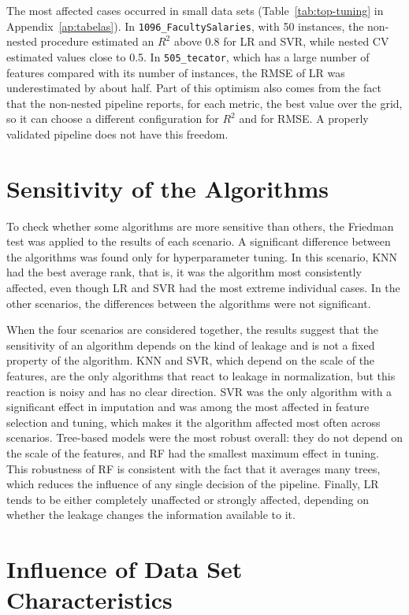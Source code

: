 The most affected cases occurred in small data sets (Table~\ref{tab:top-tuning}
in Appendix~\ref{ap:tabelas}). In \texttt{1096\_FacultySalaries}, with 50
instances, the non-nested procedure estimated an $R^2$ above 0.8 for LR and SVR,
while nested CV estimated values close to 0.5. In \texttt{505\_tecator}, which has
a large number of features compared with its number of instances, the RMSE of LR
was underestimated by about half. Part of this optimism also comes from the fact
that the non-nested pipeline reports, for each metric, the best value over the
grid, so it can choose a different configuration for $R^2$ and for RMSE. A
properly validated pipeline does not have this freedom.

\section{Sensitivity of the Algorithms}
\label{sec:res-algoritmos}

To check whether some algorithms are more sensitive than others, the Friedman
test was applied to the results of each scenario. A significant difference
between the algorithms was found only for hyperparameter tuning. In this
scenario, KNN had the best average rank, that is, it was the algorithm most
consistently affected, even though LR and SVR had the most extreme individual
cases. In the other scenarios, the differences between the algorithms were not
significant.

When the four scenarios are considered together, the results suggest that the
sensitivity of an algorithm depends on the kind of leakage and is not a fixed
property of the algorithm. KNN and SVR, which depend on the scale of the
features, are the only algorithms that react to leakage in normalization, but
this reaction is noisy and has no clear direction. SVR was the only algorithm with
a significant effect in imputation and was among the most affected in feature
selection and tuning, which makes it the algorithm affected most often across
scenarios. Tree-based models were the most robust overall: they do not depend on
the scale of the features, and RF had the smallest maximum effect in tuning. This
robustness of RF is consistent with the fact that it averages many trees, which
reduces the influence of any single decision of the pipeline. Finally, LR tends
to be either completely unaffected or strongly affected, depending on whether
the leakage changes the information available to it.

\section{Influence of Data Set Characteristics}
\label{sec:res-datasets}

